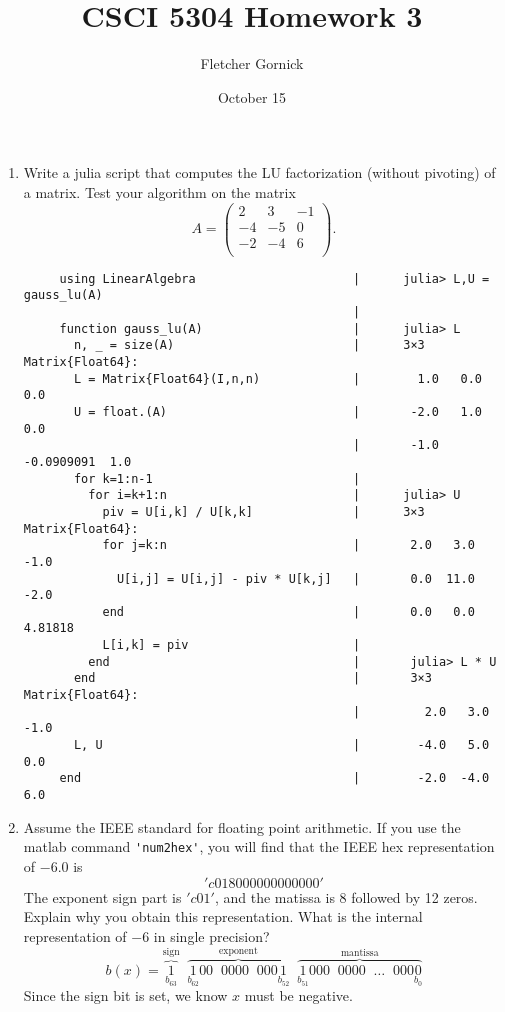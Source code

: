 \documentclass[11pt]{article}
\title{\vspace{-1.0cm}CSCI 5304 Homework 3}
\author{Fletcher Gornick}
\date{October 15}
\newcommand{\n}{\vspace{0.3cm}}
\begin{document}
\maketitle
\begin{enumerate}
	\item Write a julia script that computes the LU factorization (without pivoting) of a matrix.  Test your algorithm on the matrix
	      \[A = \left(\begin{array}{rrr} 2 & 3 & -1 \\ -4 & -5 & 0 \\ -2 & -4 & 6 \\ \end{array}\right).\]
	      \begin{verbatim}
     using LinearAlgebra                      |      julia> L,U = gauss_lu(A)
                                              |      
     function gauss_lu(A)                     |      julia> L
       n, _ = size(A)                         |      3×3 Matrix{Float64}:
       L = Matrix{Float64}(I,n,n)             |        1.0   0.0        0.0
       U = float.(A)                          |       -2.0   1.0        0.0
                                              |       -1.0  -0.0909091  1.0
       for k=1:n-1                            |      
         for i=k+1:n                          |      julia> U
           piv = U[i,k] / U[k,k]              |      3×3 Matrix{Float64}:
           for j=k:n                          |       2.0   3.0  -1.0
             U[i,j] = U[i,j] - piv * U[k,j]   |       0.0  11.0  -2.0
           end                                |       0.0   0.0   4.81818
           L[i,k] = piv                       |    
         end                                  |       julia> L * U
       end                                    |       3×3 Matrix{Float64}:
                                              |         2.0   3.0  -1.0
       L, U                                   |        -4.0   5.0   0.0
     end                                      |        -2.0  -4.0   6.0
        \end{verbatim}

	\item Assume the IEEE standard for floating point arithmetic.  If you use the matlab command \verb!'num2hex'!, you will find that the IEEE hex representation of \(-6.0\) is
	      \['c018000000000000'\]
	      The exponent sign part is \('c01'\), and the matissa is \(8\) followed by 12 zeros.  Explain why you obtain this representation.  What is the internal representation of \(-6\) in single precision?
	      \[b(x) = \overbrace{\underset{b_{63}}1}^{\text{sign}} \;\; \overbrace{\underset{b_{62}}1 00 \;\; 0000 \;\; 000 \underset{b_{52}}1}^{\text{exponent}} \;\; \overbrace{\underset{b_{51}}1 000 \;\; 0000 \;\;\hdots \;\; 000 \underset{b_0}0}^{\text{mantissa}}\]
	      Since the sign bit is set, we know \(x\) must be negative. \n


\end{enumerate}
\end{document}
